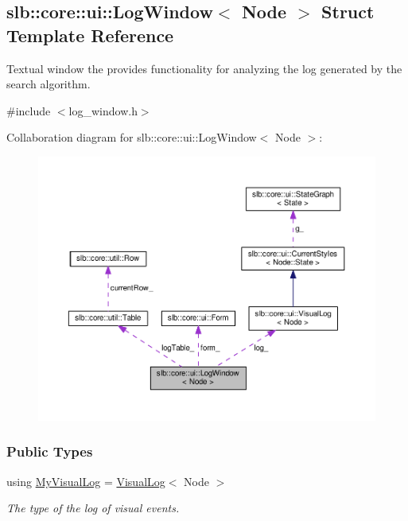 \hypertarget{structslb_1_1core_1_1ui_1_1LogWindow}{}\subsection{slb\+:\+:core\+:\+:ui\+:\+:Log\+Window$<$ Node $>$ Struct Template Reference}
\label{structslb_1_1core_1_1ui_1_1LogWindow}


Textual window the provides functionality for analyzing the log generated by the search algorithm.  




{\ttfamily \#include $<$log\+\_\+window.\+h$>$}



Collaboration diagram for slb\+:\+:core\+:\+:ui\+:\+:Log\+Window$<$ Node $>$\+:\nopagebreak
\begin{figure}[H]
\begin{center}
\leavevmode
\includegraphics[width=350pt]{structslb_1_1core_1_1ui_1_1LogWindow__coll__graph}
\end{center}
\end{figure}
\subsubsection*{Public Types}
\begin{DoxyCompactItemize}
\item 
using \hyperlink{structslb_1_1core_1_1ui_1_1LogWindow_a740f38763dad694111118ff0ab6349a6}{My\+Visual\+Log} = \hyperlink{structslb_1_1core_1_1ui_1_1VisualLog}{Visual\+Log}$<$ Node $>$\hypertarget{structslb_1_1core_1_1ui_1_1LogWindow_a740f38763dad694111118ff0ab6349a6}{}\label{structslb_1_1core_1_1ui_1_1LogWindow_a740f38763dad694111118ff0ab6349a6}

\begin{DoxyCompactList}\small\item\em The type of the log of visual events. \end{DoxyCompactList}\end{DoxyCompactItemize}
